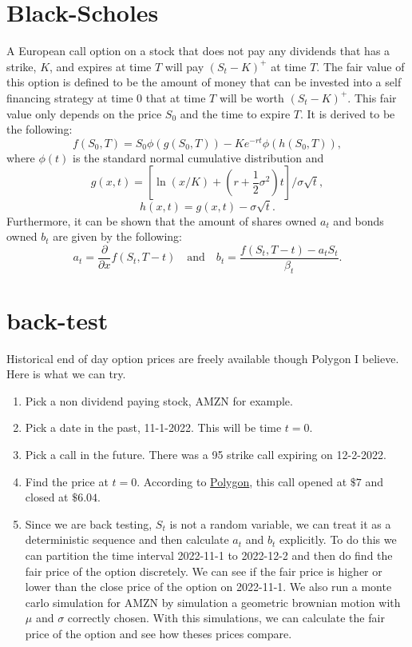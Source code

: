 \documentclass{article}
\numberwithin{equation}{section}
\begin{document}
\section{Black-Scholes}
A European call option on a stock that does not pay any dividends that has a strike, $K$, and expires at time $T$ will pay $(S_t - K)^+$ at time $T$. The fair value of this option is defined to be the amount of money that can be invested into a self financing strategy at time $0$ that at time $T$ will be worth $(S_t - K)^+$. This fair value only depends on the price $S_0$ and the time to expire $T$. It is derived to be the following:
	\begin{equation}
		f(S_0, T) = S_0 \phi(g(S_0, T)) - Ke^{-rt}\phi(h(S_0, T)),
	\end{equation}
where $\phi(t)$ is the standard normal cumulative distribution and
	\[
		g(x, t) = \left[ \ln(x / K) + \left( r + \frac{1}{2} \sigma^2 \right)t \right] / \sigma \sqrt{t},
	\]
	\[
		h(x,t) = g(x, t) - \sigma \sqrt{t}.
	\]
Furthermore, it can be shown that the amount of shares owned $a_t$ and bonds owned $b_t$ are given by the following:
	\[
		a_t = \frac{\partial}{\partial x} f(S_t, T-t) \quad \text{and} \quad b_t = \frac{f(S_t, T-t) - a_tS_t}{\beta_t}.
	\]
	
\section{back-test}
Historical end of day option prices are freely available though Polygon I believe. Here is what we can try.
	\begin{enumerate}
		\item Pick a non dividend paying stock, AMZN for example.
		\item Pick a date in the past, 11-1-2022. This will be time $t=0$.
		\item Pick a call in the future. There was a 95 strike call expiring on 12-2-2022.
		\item Find the price at $t=0$. According to \href{https://polygon.io/docs/options/get_v2_aggs_ticker__optionsticker__range__multiplier___timespan___from___to}{Polygon}, this call opened at $\$ 7$ and closed at $\$6.04$.
		\item Since we are back testing, $S_t$ is not a random variable, we can treat it as a deterministic sequence and then calculate $a_t$ and $b_t$ explicitly. To do this we can partition the time interval 2022-11-1 to 2022-12-2 and then do find the fair price of the option discretely. We can see if the fair price is higher or lower than the close price of the option on 2022-11-1. We also run a monte carlo simulation for AMZN by simulation a geometric brownian motion with $\mu$ and $\sigma$ correctly chosen. With this simulations, we can calculate the fair price of the option and see how theses prices compare. 
	\end{enumerate}
\end{document}
